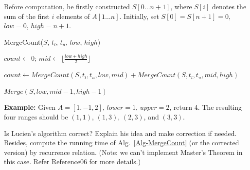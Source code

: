 \documentclass[12pt,a4paper]{article}
\theoremstyle{definition}
\begin{document}
\begin{enumerate}
    Before computation, he firstly constructed $S[0 \ldots n+1]$, where $S[i]$ denotes the sum of the first $i$ elements of $A[1 \ldots n]$. Initially, set $S[0]=S[n+1]=0$, $low=0$, $high=n+1$.

    \begin{minipage}[t]{0.90\textwidth}
	\begin{algorithm}[H]
		\BlankLine
		\caption{MergeCount($S$, $t_l$, $t_u$, $low$, $high$)}
		\label{Alg-MergeCount}
		
		$count \leftarrow 0$; $mid\leftarrow \lfloor \frac{low+high}{2} \rfloor$\;
		
		
		$count\leftarrow MergeCount(S, t_l, t_u, low, mid)+ MergeCount(S, t_l, t_u, mid, high)$\;
		
		$Merge(S,low,mid-1,high-1)$  
		
		\;
		
	\end{algorithm}
    \end{minipage}

    {\color{purple}\textbf{Example:} Given $A = [1,-1,2]$, $lower = 1$, $upper = 2$, return 4. The resulting four ranges should be $(1,1)$, $(1,3)$, $(2,3)$, and $(3,3)$.}

    Is Lucien's algorithm correct? Explain his idea and make correction if needed. Besides, compute the running time of Alg.~\ref{Alg-MergeCount} (or the corrected version) by recurrence relation. {\color{blue}(Note: we can't implement Master's Theorem in this case. Refer Reference06 for more details.)}


\end{enumerate}
\end{document}

